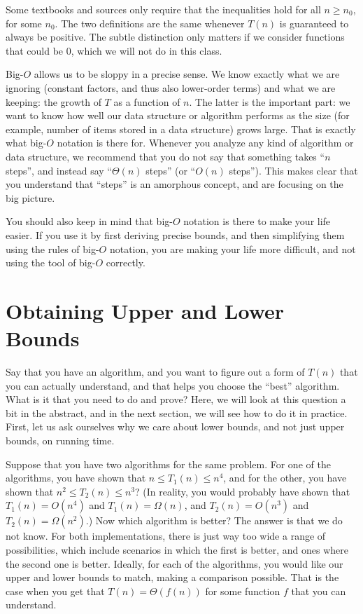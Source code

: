 \begin{remark}
Some textbooks and sources only require that the 
inequalities hold for all $n \geq n_0$, for some $n_0$.
The two definitions are the same whenever $T(n)$ is guaranteed to
always be positive. The subtle distinction only matters if we consider
functions that could be 0, which we will not do in this class.
\end{remark}

Big-$O$ allows us to be sloppy in a precise sense. 
We know exactly what we are ignoring
(constant factors, and thus also lower-order terms)
and what we are keeping:
the growth of $T$ as a function of $n$.
The latter is the important part:
we want to know how well our data structure or algorithm performs as
the size (for example, number of items stored in a data structure) grows large. 
That is exactly what big-$O$ notation is there for. 
Whenever you analyze any kind of algorithm or data structure, 
we recommend that you do not say that something takes ``$n$
steps'', and instead say ``$\Theta(n)$ steps'' (or ``$O(n)$ steps''). 
This makes clear that you understand that ``steps'' is an amorphous
concept, and are focusing on the big picture.

You should also keep in mind that big-$O$ notation is there to make
your life easier.
If you use it by first deriving precise bounds,
and then simplifying them using the rules of big-$O$ notation,
you are making your life more difficult,
and not using the tool of big-$O$ correctly.

\section{Obtaining Upper and Lower Bounds}
Say that you have an algorithm, and you want to figure out a form of
$T(n)$ that you can actually understand, and that helps you choose the
``best'' algorithm. What is it that you need to do and prove?
Here, we will look at this question a bit in the abstract,
and in the next section, we will see how to do it in practice.
First, let us ask ourselves why we care about lower bounds,
and not just upper bounds, on running time.

Suppose that you have two algorithms for the same problem.
For one of the algorithms, you have shown that $n \leq T_1(n) \leq n^4$,
and for the other, you have shown that $n^2 \leq T_2(n) \leq n^3$?
(In reality, you would probably have shown that $T_1(n) = O(n^4)$ and
$T_1(n) = \Omega(n)$, and $T_2(n) = O(n^3)$ and $T_2(n) = \Omega(n^2)$.)
Now which algorithm is better?
The answer is that we do not know. 
For both implementations, there is just way too wide a range of
possibilities, which include scenarios in which the first is better,
and ones where the second one is better.
Ideally, for each of the algorithms, you would like our upper and
lower bounds to match, making a comparison possible. 
That is the case when you get that $T(n) = \Theta(f(n))$ for some
function $f$ that you can understand.

